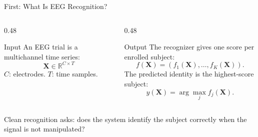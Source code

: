 \documentclass[aspectratio=169,11pt]{beamer}
\newcommand{\smallgap}{\vspace{0.45em}}
\begin{document}
\begin{frame}{First: What Is EEG Recognition?}
\begin{columns}[T,onlytextwidth]
  \begin{column}{0.48\textwidth}
    \begin{block}{Input}
      An EEG trial is a multichannel time series:
      \[
      \mathbf{X}\in\mathbb{R}^{C\times T}
      \]
      \(C\): electrodes. \quad \(T\): time samples.
    \end{block}
  \end{column}
  \begin{column}{0.48\textwidth}
    \begin{block}{Output}
      The recognizer gives one score per enrolled subject:
      \[
      f(\mathbf{X})=(f_1(\mathbf{X}),\ldots,f_K(\mathbf{X})).
      \]
      The predicted identity is the highest-score subject:
      \[
      \hat{y}(\mathbf{X})=\arg\max_j f_j(\mathbf{X}).
      \]
    \end{block}
  \end{column}
\end{columns}

\smallgap
\begin{center}
\small Clean recognition asks: does the system identify the subject correctly when the signal is not manipulated?
\end{center}
\end{frame}
\end{document}
